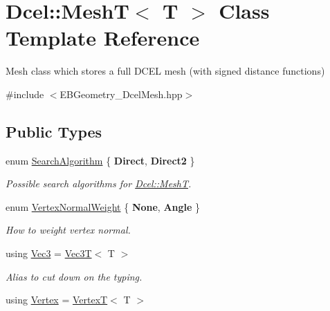 \hypertarget{classDcel_1_1MeshT}{}\section{Dcel\+:\+:MeshT$<$ T $>$ Class Template Reference}
\label{classDcel_1_1MeshT}


Mesh class which stores a full D\+C\+EL mesh (with signed distance functions)  




{\ttfamily \#include $<$E\+B\+Geometry\+\_\+\+Dcel\+Mesh.\+hpp$>$}

\subsection*{Public Types}
\begin{DoxyCompactItemize}
\item 
enum \hyperlink{classDcel_1_1MeshT_abb4c3bb7a52804bb041c133f30151399}{Search\+Algorithm} \{ {\bfseries Direct}, 
{\bfseries Direct2}
 \}\begin{DoxyCompactList}\small\item\em Possible search algorithms for \hyperlink{classDcel_1_1MeshT}{Dcel\+::\+MeshT}. \end{DoxyCompactList}
\item 
\mbox{\label{classDcel_1_1MeshT_a0cd3a02853cf4fcc34a0816368ed4dc0}} 
enum \hyperlink{classDcel_1_1MeshT_a0cd3a02853cf4fcc34a0816368ed4dc0}{Vertex\+Normal\+Weight} \{ {\bfseries None}, 
{\bfseries Angle}
 \}\begin{DoxyCompactList}\small\item\em How to weight vertex normal. \end{DoxyCompactList}
\item 
\mbox{\label{classDcel_1_1MeshT_a646c5d8f66b3079bca35fe4186493627}} 
using \hyperlink{classDcel_1_1MeshT_a646c5d8f66b3079bca35fe4186493627}{Vec3} = \hyperlink{classVec3T}{Vec3T}$<$ T $>$
\begin{DoxyCompactList}\small\item\em Alias to cut down on the typing. \end{DoxyCompactList}\item 
\mbox{\label{classDcel_1_1MeshT_a58b357c4ad94f4a4b813ed7ebf01cd05}} 
using \hyperlink{classDcel_1_1MeshT_a58b357c4ad94f4a4b813ed7ebf01cd05}{Vertex} = \hyperlink{classDcel_1_1VertexT}{VertexT}$<$ T $>$

\end{DoxyCompactItemize}
